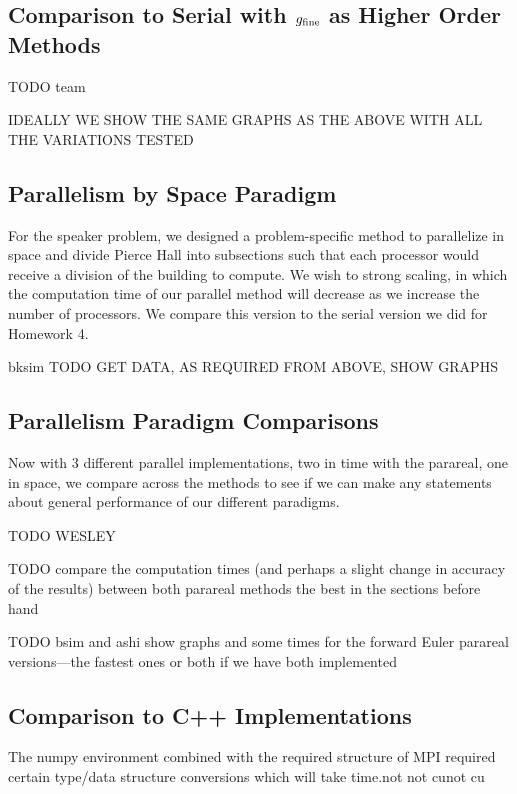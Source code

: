 \documentclass[letterpaper,12pt]{article}
\begin{document}
\subsection{Comparison to Serial with $g_{\textnormal{fine}}$ as Higher Order Methods}

TODO team

IDEALLY WE SHOW THE SAME GRAPHS AS THE ABOVE WITH ALL THE VARIATIONS TESTED

\subsection{Parallelism by Space Paradigm}

For the speaker problem, we designed a problem-specific method to parallelize in space and divide Pierce Hall into subsections such that each processor would receive a division of the building to compute. We wish to strong scaling, in which the computation time of our parallel method will decrease as we increase the number of processors. We compare this version to the serial version we did for Homework 4.

bksim TODO GET DATA, AS REQUIRED FROM ABOVE, SHOW GRAPHS

\subsection{Parallelism Paradigm Comparisons}

Now with 3 different parallel implementations, two in time with the parareal, one in space, we compare across the methods to see if we can make any statements about general performance of our different paradigms.

TODO WESLEY

TODO compare the computation times (and perhaps a slight change in accuracy of the results) between both parareal methods the best in the sections before hand

TODO bsim and ashi show graphs and some times for the forward Euler parareal
versions---the fastest ones or both if we have both implemented

\subsection{Comparison to C++ Implementations}

The numpy environment combined with the required structure of MPI required
certain type/data structure conversions which will take time.not not cunot cu
\end{document}
